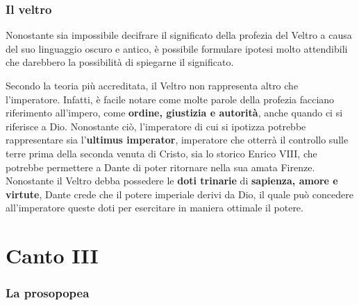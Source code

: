 \documentclass[10pt,a4paper]{article}
\begin{document}
		\subsubsection{Il veltro}
		
		Nonostante sia impossibile decifrare il significato della profezia del Veltro a causa del suo linguaggio oscuro e antico, è possibile formulare ipotesi molto attendibili che darebbero la possibilità di spiegarne il significato.
		
		Secondo la teoria più accreditata, il Veltro non rappresenta altro che l'imperatore. Infatti, è facile notare come molte parole della profezia facciano riferimento all'impero, come \textbf{ordine, giustizia e autorità}, anche quando ci si riferisce a Dio. Nonostante ciò, l'imperatore di cui si ipotizza potrebbe rappresentare sia l'\textbf{ultimus imperator}, imperatore che otterrà il controllo sulle terre prima della seconda venuta di Cristo, sia lo storico Enrico VIII, che potrebbe permettere a Dante di poter ritornare nella sua amata Firenze. Nonostante il Veltro debba possedere le \textbf{doti trinarie} di \textbf{sapienza, amore e virtute}, Dante crede che il potere imperiale derivi da Dio, il quale può concedere all'imperatore queste doti per esercitare in maniera ottimale il potere.
		
	\section{Canto III}
		
		\subsubsection{La prosopopea}
		
		 
 	
\end{document}
